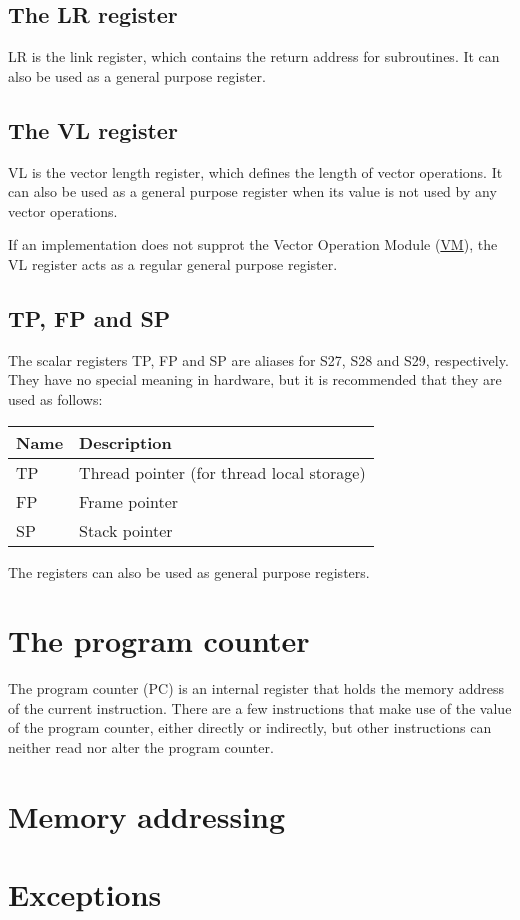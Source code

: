 \subsection{The LR register}

LR is the link register, which contains the return address for subroutines. It
can also be used as a general purpose register.

\subsection{The VL register}

VL is the vector length register, which defines the length of vector
operations. It can also be used as a general purpose register when its value
is not used by any vector operations.

If an implementation does not supprot the Vector Operation Module
(\hyperref[module:VM]{VM}), the VL register acts as a regular general purpose
register.

\subsection{TP, FP and SP}

The scalar registers TP, FP and SP are aliases for S27, S28 and S29,
respectively. They have no special meaning in hardware, but it is recommended
that they are used as follows:

\begin{tabular}{|l|l|}
  \hline
  \textbf{Name} & \textbf{Description} \\
  \hline
  TP & Thread pointer (for thread local storage) \\
  \hline
  FP & Frame pointer \\
  \hline
  SP & Stack pointer \\
  \hline
\end{tabular}

The registers can also be used as general purpose registers.

\section{The program counter}

The program counter (PC) is an internal register that holds the memory address
of the current instruction. There are a few instructions that make use of the
value of the program counter, either directly or indirectly, but other
instructions can neither read nor alter the program counter.

\section{Memory addressing}

\tbd

\section{Exceptions}

\tbd
